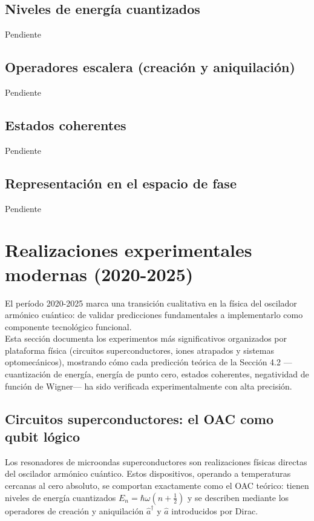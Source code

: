 \documentclass[11pt,a4paper,spanish]{book}
\begin{document}
\subsection*{Niveles de energía cuantizados}
Pendiente

\subsection*{Operadores escalera (creación y aniquilación)}
Pendiente

\subsection*{Estados coherentes}
Pendiente

\subsection*{Representación en el espacio de fase}
Pendiente


\section{Realizaciones experimentales modernas (2020-2025)}
El período 2020-2025 marca una transición cualitativa en la física del oscilador armónico cuántico: de validar predicciones fundamentales a implementarlo como componente tecnológico funcional.\\

Esta sección documenta los experimentos más significativos organizados por plataforma física (circuitos superconductores, iones atrapados y sistemas optomecánicos), mostrando cómo cada predicción teórica de la Sección 4.2 —cuantización de energía, energía de punto cero, estados coherentes, negatividad de función de Wigner— ha sido verificada experimentalmente con alta precisión.\\ 


\subsection*{Circuitos superconductores: el OAC como qubit lógico}

Los resonadores de microondas superconductores son realizaciones físicas directas del oscilador armónico cuántico. Estos dispositivos, operando a temperaturas cercanas al cero absoluto, se comportan exactamente como el OAC teórico: tienen niveles de energía cuantizados $E_n = \hbar\omega(n + \frac{1}{2})$ y se describen mediante los operadores de creación y aniquilación $\hat{a}^\dagger$ y $\hat{a}$ introducidos por Dirac.\\
\end{document}
